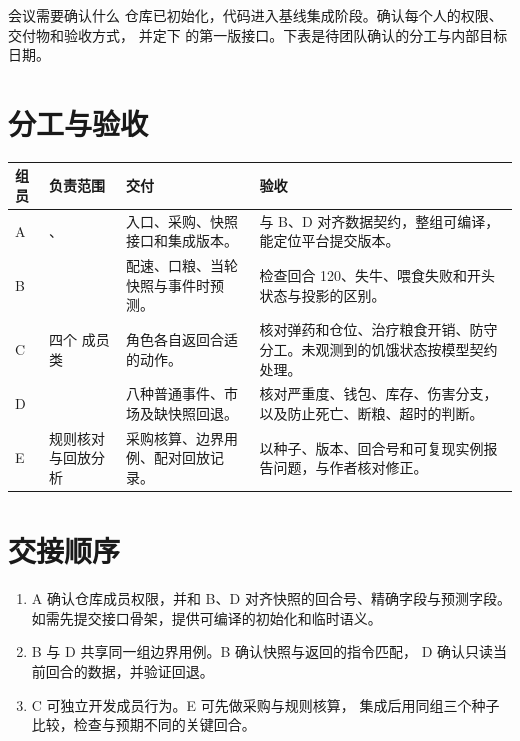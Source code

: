 \documentclass[UTF8,11pt,a4paper]{ctexart}
\begin{document}
\maketitle
\thispagestyle{fancy}

\begin{keybox}{会议需要确认什么}
仓库已初始化，代码进入基线集成阶段。确认每个人的权限、交付物和验收方式，
并定下  的第一版接口。下表是待团队确认的分工与内部目标日期。
\end{keybox}

\section{分工与验收}

\begin{center}\small
\begin{tabularx}{\linewidth}{@{}L{0.8cm}L{3.5cm}Y Y@{}}
\toprule
组员 & 负责范围 & 交付 & 验收 \\
\midrule
A & 、 & 入口、采购、快照接口和集成版本。 &
与 B、D 对齐数据契约，整组可编译，能定位平台提交版本。 \\
B &  & 配速、口粮、当轮快照与事件时预测。 &
检查回合 120、失牛、喂食失败和开头状态与投影的区别。 \\
C & 四个  成员类 & 角色各自返回合适的动作。 &
核对弹药和仓位、治疗粮食开销、防守分工。未观测到的饥饿状态按模型契约处理。 \\
D &  & 八种普通事件、市场及缺快照回退。 &
核对严重度、钱包、库存、伤害分支，以及防止死亡、断粮、超时的判断。 \\
E & 规则核对与回放分析 & 采购核算、边界用例、配对回放记录。 &
以种子、版本、回合号和可复现实例报告问题，与作者核对修正。 \\
\bottomrule
\end{tabularx}
\end{center}

\section{交接顺序}

\begin{enumerate}
  \item A 确认仓库成员权限，并和 B、D 对齐快照的回合号、精确字段与预测字段。
  如需先提交接口骨架，提供可编译的初始化和临时语义。
  \item B 与 D 共享同一组边界用例。B 确认快照与返回的指令匹配，
  D 确认只读当前回合的数据，并验证回退。
  \item C 可独立开发成员行为。E 可先做采购与规则核算，
  集成后用同组三个种子比较，检查与预期不同的关键回合。
\end{enumerate}
\end{document}
